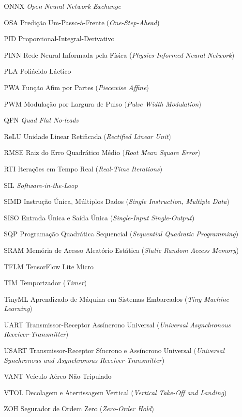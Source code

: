\begin{siglas}
    \item[ONNX] \textit{Open Neural Network Exchange}
    \item[OSA] Predição Um-Passo-à-Frente (\textit{One-Step-Ahead})
    \item[PID] Proporcional-Integral-Derivativo
    \item[PINN] Rede Neural Informada pela Física (\textit{Physics-Informed Neural Network})
    \item[PLA] Poliácido Láctico
    \item[PWA] Função Afim por Partes (\textit{Piecewise Affine})
    \item[PWM] Modulação por Largura de Pulso (\textit{Pulse Width Modulation})
    \item[QFN] \textit{Quad Flat No-leads}
    \item[ReLU] Unidade Linear Retificada (\textit{Rectified Linear Unit})
    \item[RMSE] Raiz do Erro Quadrático Médio (\textit{Root Mean Square Error})
    \item[RTI] Iterações em Tempo Real (\textit{Real-Time Iterations})
    \item[SIL] \textit{Software-in-the-Loop}
    \item[SIMD] Instrução Única, Múltiplos Dados (\textit{Single Instruction, Multiple Data})
    \item[SISO] Entrada Única e Saída Única (\textit{Single-Input Single-Output})
    \item[SQP] Programação Quadrática Sequencial (\textit{Sequential Quadratic Programming})
    \item[SRAM] Memória de Acesso Aleatório Estática (\textit{Static Random Access Memory})
    \item[TFLM] TensorFlow Lite Micro
    \item[TIM] Temporizador (\textit{Timer})
    \item[TinyML] Aprendizado de Máquina em Sistemas Embarcados (\textit{Tiny Machine Learning})
    \item[UART] Transmissor-Receptor Assíncrono Universal (\textit{Universal Asynchronous Receiver-Transmitter})
    \item[USART] Transmissor-Receptor Síncrono e Assíncrono Universal (\textit{Universal Synchronous and Asynchronous Receiver-Transmitter})
    \item[VANT] Veículo Aéreo Não Tripulado
    \item[VTOL] Decolagem e Aterrissagem Vertical (\textit{Vertical Take-Off and Landing})
    \item[ZOH] Segurador de Ordem Zero (\textit{Zero-Order Hold})
\end{siglas}

